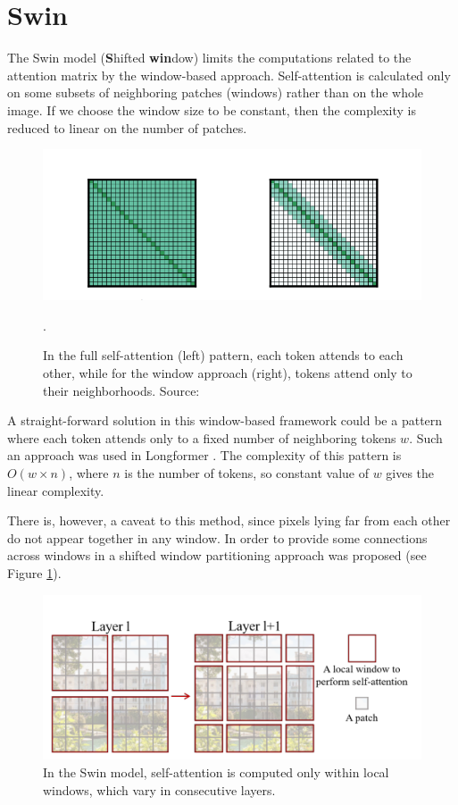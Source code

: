 \documentclass[magisterska,en]{pracamgr}
\begin{document}
\section{Swin}\label{r:swin}
The Swin model (\textbf{S}hifted \textbf{win}dow) \cite{DBLP:conf/iccv/LiuL00W0LG21} limits the computations related to the attention matrix by the window-based approach. Self-attention is calculated only on some subsets of neighboring patches (windows) rather than on the whole image. If we choose the window size to be constant, then the complexity is reduced to linear on the number of patches.

\begin{figure}[H]
\centering
\includegraphics[scale=0.4]{./images/sliding_window.png}
\caption{In the full self-attention (left) pattern, each token attends to each other, while for the window approach (right), tokens attend only to their neighborhoods. Source: \cite{DBLP:journals/corr/abs-2004-05150}}.
\end{figure}


A straight-forward solution in this window-based framework could be a pattern where each token attends only to a fixed number of neighboring tokens $w$. Such an approach was used in Longformer \cite{DBLP:journals/corr/abs-2004-05150}. The complexity of this pattern is $O(w \times n)$, where $n$ is the number of tokens, so constant
value of $w$ gives the linear complexity.

There is, however, a caveat to this method, since pixels lying far from each other do not appear together in any window. In order to provide some connections across windows in \cite{DBLP:conf/iccv/LiuL00W0LG21} a shifted window partitioning approach was proposed (see Figure \ref{changing_windows}).


\begin{figure}[H]
\centering
\includegraphics[scale=0.6]{./images/changing_windows.png}
\caption{In the Swin model, self-attention is computed only within local windows, which vary in consecutive layers.}
\label{changing_windows}
\end{figure}
\end{document}
